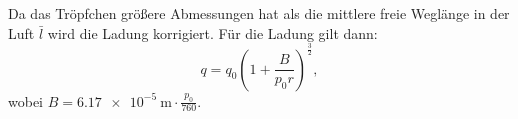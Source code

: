 Da das Tröpfchen größere Abmessungen hat als die mittlere
freie Weglänge in der Luft $\bar{l}$ wird die Ladung korrigiert.
Für die Ladung gilt dann:
\begin{equation}
  q = q_0 \left( 1 + \frac{B}{p_0 r} \right)^{\frac{3}{2}},
\end{equation}
wobei $B = \SI{6.17e-5}{\meter} \cdot \frac{p_0}{760}$.
